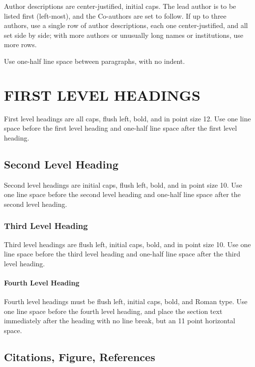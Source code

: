 \documentclass[twoside]{article}
\begin{document}
Author descriptions are center-justified, initial caps.  The lead
author is to be listed first (left-most), and the Co-authors are set
to follow.  If up to three authors, use a single row of author
descriptions, each one center-justified, and all set side by side;
with more authors or unusually long names or institutions, use more
rows.

Use one-half line space between paragraphs, with no indent.

\section{FIRST LEVEL HEADINGS}

First level headings are all caps, flush left, bold, and in point size
12. Use one line space before the first level heading and one-half line space
after the first level heading.

\subsection{Second Level Heading}

Second level headings are initial caps, flush left, bold, and in point
size 10. Use one line space before the second level heading and one-half line
space after the second level heading.

\subsubsection{Third Level Heading}

Third level headings are flush left, initial caps, bold, and in point
size 10. Use one line space before the third level heading and one-half line
space after the third level heading.

\paragraph{Fourth Level Heading}

Fourth level headings must be flush left, initial caps, bold, and
Roman type.  Use one line space before the fourth level heading, and
place the section text immediately after the heading with no line
break, but an 11 point horizontal space.

\subsection{Citations, Figure, References}
\end{document}
